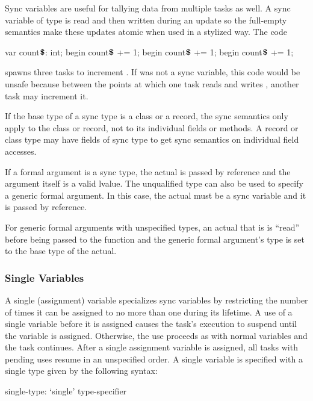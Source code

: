 \begin{example}
Sync variables are useful for tallying data from multiple tasks as
well.  A sync variable of type  is read and then written
during an update so the full-empty semantics make these updates atomic
when used in a stylized way.  The code
\begin{chapel}
var count$\mbox{{\bf \$}}$: int;
begin count$\mbox{{\bf \$}}$ += 1;
begin count$\mbox{{\bf \$}}$ += 1;
begin count$\mbox{{\bf \$}}$ += 1;
\end{chapel}
spawns three tasks to increment .
If  was not a sync variable, this code
would be unsafe because between the points at which one task
reads  and
writes , another task may increment it.
\end{example}

If the base type of a sync type is a class or a record, the sync
semantics only apply to the class or record, not to its individual
fields or methods.  A record or class type may have fields of sync
type to get sync semantics on individual field accesses.

If a formal argument is a sync type, the actual is passed by reference
and the argument itself is a valid lvalue.  The unqualified
type  can also be used to specify a generic formal
argument.  In this case, the actual must be a sync variable and it is
passed by reference.

For generic formal arguments with unspecified types, an actual that
is  is ``read'' before being passed to the function and the
generic formal argument's type is set to the base type of the actual.

\subsubsection{Single Variables}
\label{Single_Variables}

A single (assignment) variable specializes sync variables by
restricting the number of times it can be assigned to no more than one
during its lifetime.  A use of a single variable before it is assigned
causes the task's execution to suspend until the variable is assigned.
Otherwise, the use proceeds as with normal variables and the task
continues.  After a single assignment variable is assigned, all tasks
with pending uses resume in an unspecified order.  A single variable
is specified with a single type given by the following syntax:
\begin{syntax}
single-type:
  `single' type-specifier
\end{syntax}

